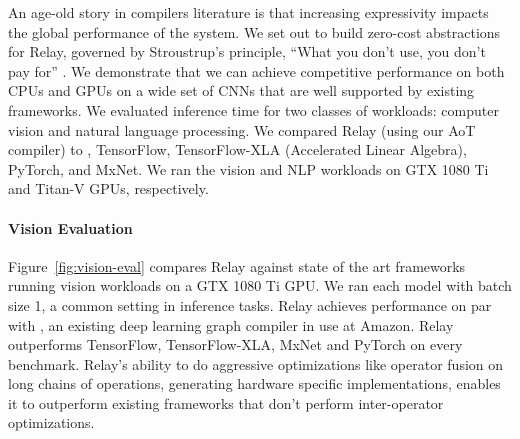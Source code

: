   \begin{figure}[h]
  \end{figure}

  \begin{figure}[h]
  \end{figure}

  An age-old story in compilers literature is that increasing expressivity
    impacts the global performance of the system.
  We set out to build zero-cost abstractions for Relay,
    governed by Stroustrup's principle, ``What you don't use, you don't pay
    for'' \citep{bjarne}.
  We demonstrate that we can achieve competitive performance on both CPUs and
    GPUs on a wide set of CNNs that are well supported by existing frameworks.
  We evaluated inference time for two classes of workloads: computer vision and natural language processing.
  We compared Relay (using our AoT compiler) to \nnvm,
    TensorFlow, TensorFlow-XLA (Accelerated Linear Algebra), PyTorch, and MxNet.
  We ran the vision and NLP workloads on GTX 1080 Ti and Titan-V GPUs, respectively.

  \paragraph{Vision Evaluation}
  Figure~\ref{fig:vision-eval} compares Relay against state of the art frameworks
    running vision workloads on a GTX 1080 Ti GPU.
  We ran each model with
    batch size 1, a common setting in inference tasks.
  Relay achieves performance on par with \nnvm,
    an existing deep learning graph compiler in use at Amazon.
  Relay outperforms TensorFlow, TensorFlow-XLA, MxNet and
    PyTorch on every benchmark.
  Relay's ability to do aggressive optimizations like operator
    fusion on long chains of operations, generating hardware
    specific implementations, enables it to outperform
    existing frameworks that don't perform inter-operator optimizations.

